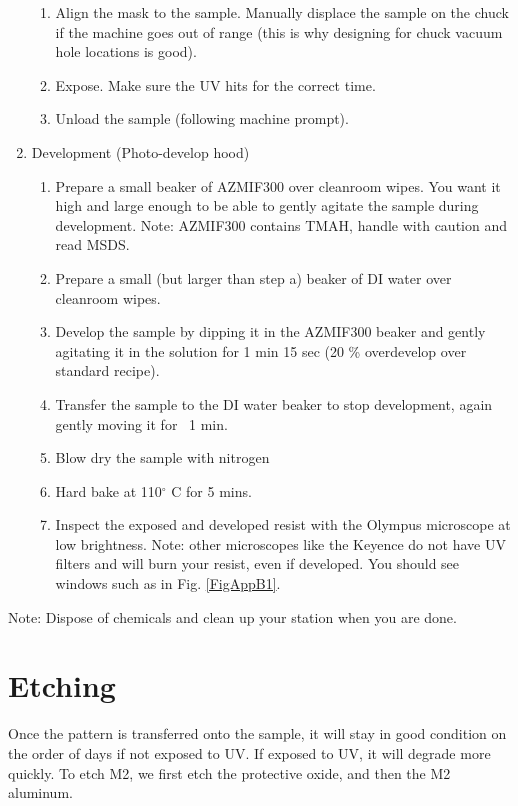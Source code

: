 \begin{enumerate}
\begin{enumerate}
        \item Align the mask to the sample. Manually displace the sample on the chuck if the machine goes out of range (this is why designing for chuck vacuum hole locations is good). 
        \item Expose. Make sure the UV hits for the correct time. 
        \item Unload the sample (following machine prompt). 
    \end{enumerate}
    \item Development (Photo-develop hood) 
    \begin{enumerate}
        \item Prepare a small beaker of AZMIF300 over cleanroom wipes. You want it high and large enough to be able to gently agitate the sample during development. Note: AZMIF300 contains TMAH, handle with caution and read MSDS.
        \item Prepare a small (but larger than step a) beaker of DI water over cleanroom wipes. 
        \item Develop the sample by dipping it in the AZMIF300 beaker and gently agitating it in the solution for 1 min 15 sec (20 \% overdevelop over standard recipe). 
        \item Transfer the sample to the DI water beaker to stop development, again gently moving it for ~1 min. 
        \item Blow dry the sample with nitrogen 
        \item Hard bake at 110$^\circ$ C for 5 mins. 
        \item Inspect the exposed and developed resist with the Olympus microscope at low brightness. Note: other microscopes like the Keyence do not have UV filters and will burn your resist, even if developed. You should see windows such as in Fig. \ref{FigAppB1}.
    \end{enumerate}
\end{enumerate}
Note: Dispose of chemicals and clean up your station when you are done. 

\section{Etching}
\qquad Once the pattern is transferred onto the sample, it will stay in good condition on the order of days if not exposed to UV. If exposed to UV, it will degrade more quickly. To etch M2, we first etch the protective oxide, and then the M2 aluminum.  

